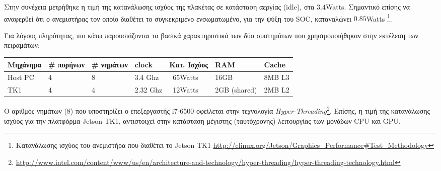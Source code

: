 Στην συνέχεια μετρήθηκε η τιμή της κατανάλωσης ισχύος της πλακέτας σε κατάσταση αεργίας (idle),
στα $3.4$Watts. Σημαντικό επίσης να αναφερθεί ότι ο ανεμιστήρας τον οποίο
διαθέτει το συγκεκριμένο ενσωματωμένο, για την ψύξη του SOC, καταναλώνει $0.85$Watts
\footnote{Κατανάλωσης ισχύος του ανεμιστήρα που διαθέτει το Jetson TK1 \url{http://elinux.org/Jetson/Graphics_Performance\#Test_Methodology}}.

Για λόγους πληρότητας, πιο κάτω παρουσιάζονται τα βασικά χαρακτηριστικά
των δύο συστημάτων που χρησιμοποιήθηκαν στην εκτέλεση των πειραμάτων:
\begin{center}
\small
\begin{tabular}{ | l | l | l | l | l | l | l | }
  \hline
  \rowcolor{Gray}
  Μηχάνημα & \# πυρήνων & \# νημάτων & clock & Κατ. Ισχύος & RAM & Cache \\
  \hline
  Host PC & 4 & 8 & 3.4 Ghz & ~65Watts & 16GB & 8MΒ L3 \\
  \hline
  TK1 & 4 & 4 & 2.32 Ghz & ~12Watts & 2GB (shared) & 2MB L2 \\
  \hline
\end{tabular}
\end{center}

Ο αριθμός νημάτων (8) που υποστηρίζει ο επεξεργαστής i7-6500 οφείλεται στην
τεχνολογία \emph{Hyper-Threading}\footnote{\url{http://www.intel.com/content/www/us/en/architecture-and-technology/hyper-threading/hyper-threading-technology.html}}.
Επίσης, η τιμή της κατανάλωσης ισχύος για την
πλατφόρμα Jetson TK1, αντιστοιχεί στην κατάσταση μέγιστης (ταυτόχρονης) λειτουργίας των μονάδων
CPU και GPU.




\newpage

